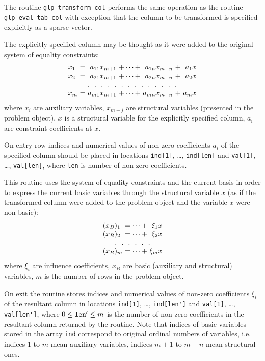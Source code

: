 The routine \verb|glp_transform_col| performs the same operation as the
routine \verb|glp_eval_tab_col| with exception that the column to be
transformed is specified explicitly as a sparse vector.

The explicitly specified column may be thought as it were added to
the original system of equality constraints:
$$
\begin{array}{l@{\ }c@{\ }r@{\ }c@{\ }r@{\ }c@{\ }r}
x_1&=&a_{11}x_{m+1}&+\dots+&a_{1n}x_{m+n}&+&a_1x \\
x_2&=&a_{21}x_{m+1}&+\dots+&a_{2n}x_{m+n}&+&a_2x \\
\multicolumn{7}{c}
{.\ \ .\ \ .\ \ .\ \ .\ \ .\ \ .\ \ .\ \ .\ \ .\ \ .\ \ .\ \ .\ \ .}\\
x_m&=&a_{m1}x_{m+1}&+\dots+&a_{mn}x_{m+n}&+&a_mx \\
\end{array}
$$
where $x_i$ are auxiliary variables, $x_{m+j}$ are structural variables
(presented in the problem object), $x$ is a structural variable for the
explicitly specified column, $a_i$ are constraint coefficients at $x$.

On entry row indices and numerical values of non-zero coefficients
$a_i$ of the specified column should be placed in locations
\verb|ind[1]|, \dots, \verb|ind[len]| and \verb|val[1]|, \dots,
\verb|val[len]|, where \verb|len| is number of non-zero coefficients.

This routine uses the system of equality constraints and the current
basis in order to express the current basic variables through the
structural variable $x$ (as if the transformed column were added to the
problem object and the variable $x$ were non-basic):
$$
\begin{array}{l@{\ }c@{\ }r}
(x_B)_1&=\dots+&\xi_{1}x\\
(x_B)_2&=\dots+&\xi_{2}x\\
\multicolumn{3}{c}{.\ \ .\ \ .\ \ .\ \ .\ \ .}\\
(x_B)_m&=\dots+&\xi_{m}x\\
\end{array}
$$
where $\xi_i$ are influence coefficients, $x_B$ are basic (auxiliary
and structural) variables, $m$ is the number of rows in the problem
object.

On exit the routine stores indices and numerical values of non-zero
coefficients $\xi_i$ of the resultant column in locations \verb|ind[1]|,
\dots, \verb|ind[len']| and \verb|val[1]|, \dots, \verb|val[len']|,
where $0\leq{\tt len'}\leq m$ is the number of non-zero coefficients in
the resultant column returned by the routine. Note that indices of basic
variables stored in the array \verb|ind| correspond to original ordinal
numbers of variables, i.e. indices 1 to $m$ mean auxiliary variables,
indices $m+1$ to $m+n$ mean structural ones.

